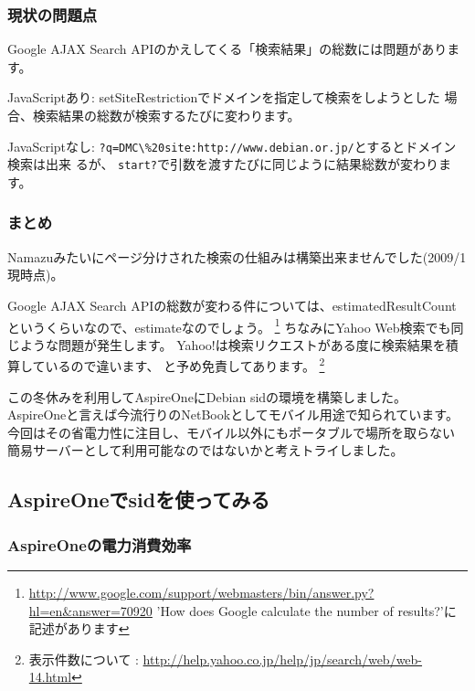 \documentclass[mingoth,a4paper]{jsarticle}
\begin{document}
\subsubsection{現状の問題点}

Google AJAX Search APIのかえしてくる「検索結果」の総数には問題があります。

JavaScriptあり:
setSiteRestrictionでドメインを指定して検索をしようとした
場合、検索結果の総数が検索するたびに変わります。

JavaScriptなし:
\verb!?q=DMC\%20site:http://www.debian.or.jp/!とするとドメイン検索は出来
るが、
\verb!start?!で引数を渡すたびに同じように結果総数が変わります。

\subsubsection{まとめ}

Namazuみたいにページ分けされた検索の仕組みは構築出来ませんでした(2009/1
現時点)。

Google AJAX Search APIの総数が変わる件については、estimatedResultCount
というくらいなので、estimateなのでしょう。
\footnote{\url{http://www.google.com/support/webmasters/bin/answer.py?hl=en&answer=70920}
'How does Google calculate the number of results?'に記述があります}
ちなみにYahoo Web検索でも同じような問題が発生します。
Yahoo!は検索リクエストがある度に検索結果を積算しているので違います、
と予め免責してあります。
\footnote{表示件数について :
\url{http://help.yahoo.co.jp/help/jp/search/web/web-14.html}}


この冬休みを利用してAspireOneにDebian sidの環境を構築しました。
AspireOneと言えば今流行りのNetBookとしてモバイル用途で知られています。
今回はその省電力性に注目し、モバイル以外にもポータブルで場所を取らない
簡易サーバーとして利用可能なのではないかと考えトライしました。

\subsection{AspireOneでsidを使ってみる}

\subsubsection{AspireOneの電力消費効率}
\end{document}
